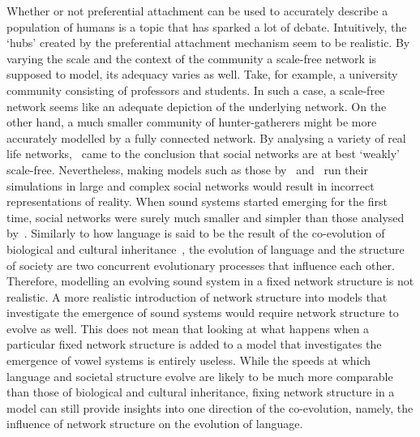\documentclass{article}
\begin{document}
Whether or not preferential attachment can be used to accurately describe a population of humans is a topic that has
sparked a lot of debate. Intuitively, the `hubs' created by the preferential attachment mechanism seem to be realistic.
By varying the scale and the context of the community a scale-free network is supposed to model, its adequacy varies as
well. Take, for example, a university community consisting of professors and students. In such a case, a scale-free
network seems like an adequate depiction of the underlying network. On the other hand, a much smaller community of
hunter-gatherers might be more accurately modelled by a fully connected network. By analysing a variety of real life
networks,~ came to the conclusion that social networks are at best `weakly'
scale-free. Nevertheless, making models such as those by~
and~ run their simulations in large and complex social networks
would result in incorrect representations of reality. When sound systems started emerging for the first time, social
networks were surely much smaller and simpler than those analysed by~.
Similarly to how language is said to be the result of the co-evolution of biological and cultural
inheritance~, the evolution of language and the structure of
society are two concurrent evolutionary processes that influence each other. Therefore, modelling an evolving sound
system in a fixed network structure is not realistic. A more realistic introduction of network structure into models
that investigate the emergence of sound systems would require network structure to evolve as well. This does not mean
that looking at what happens when a particular fixed network structure is added to a model that investigates the
emergence of vowel systems is entirely useless. While the speeds at which language and societal structure evolve are
likely to be much more comparable than those of biological and cultural inheritance, fixing network structure in a
model can still provide insights into one direction of the co-evolution, namely, the influence of network structure on
the evolution of language.
\end{document}
